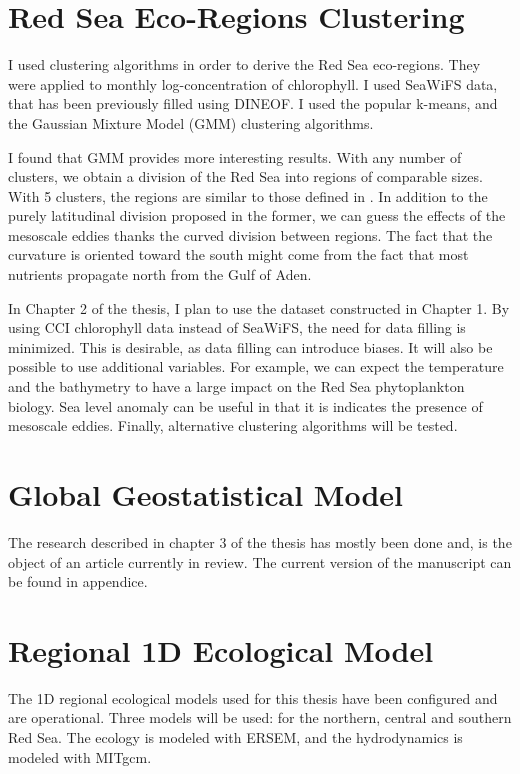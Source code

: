 \section{Red Sea Eco-Regions Clustering}

I used clustering algorithms in order to derive the Red Sea eco-regions. They
were applied to monthly log-concentration of chlorophyll. I used SeaWiFS data,
that has been previously filled using DINEOF. I used the popular k-means, and
the Gaussian Mixture Model (GMM) clustering algorithms.

I found that GMM provides more interesting results. With any number of
clusters, we obtain a division of the Red Sea into regions of comparable sizes.
With 5 clusters, the regions are similar to those defined in
\citet{Raitsos2013}. In addition to the purely latitudinal division proposed in
the former, we can guess the effects of the mesoscale eddies thanks the curved
division between regions. The fact that the curvature is oriented toward the
south might come from the fact that most nutrients propagate north from the
Gulf of Aden.

In Chapter 2 of the thesis, I plan to use the dataset constructed in Chapter 1.
By using CCI chlorophyll data instead of SeaWiFS, the need for data filling is
minimized. This is desirable, as data filling can introduce biases. It will
also be possible to use additional variables. For example, we can expect the
temperature and the bathymetry to have a large impact on the Red Sea
phytoplankton biology. Sea level anomaly can be useful in that it is indicates
the presence of mesoscale eddies. Finally, alternative clustering algorithms
will be tested.

\section{Global Geostatistical Model}

The research described in chapter 3 of the thesis has mostly been done and, is
the object of an article currently in review. The current version of the
manuscript can be found in appendice.

\section{Regional 1D Ecological Model}

The 1D regional ecological models used for this thesis have been configured
and are operational. Three models will be used: for the northern, central and 
southern Red Sea. The ecology is modeled with ERSEM, and the hydrodynamics
is modeled with MITgcm.


